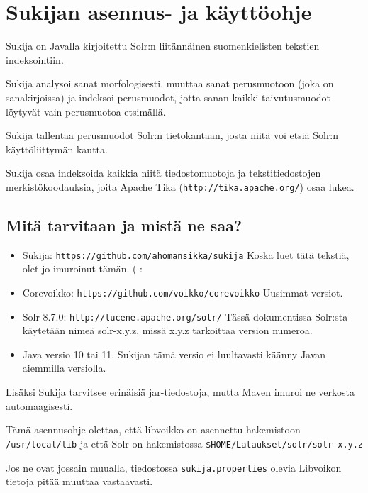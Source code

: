 \documentclass[12pt]{article}
\begin{document}
\pagestyle{fancy}
\setlength{\parindent}{0pt}
\setlength{\parskip}{1ex plus 0.5ex minus 0.2ex}
\section*{Sukijan asennus- ja käyttöohje}


Sukija on Javalla kirjoitettu Solr:n liitännäinen suomenkielisten
tekstien indeksointiin.

Sukija analysoi sanat morfologisesti, muuttaa sanat perusmuotoon (joka
on sanakirjoissa) ja indeksoi perusmuodot, jotta sanan kaikki
taivutusmuodot löytyvät vain perusmuotoa etsimällä.

Sukija tallentaa perusmuodot Solr:n tietokantaan, josta niitä voi
etsiä Solr:n käyttöliittymän kautta.

Sukija osaa indeksoida kaikkia niitä tiedostomuotoja ja
tekstitiedostojen merkistökoodauksia, joita Apache Tika
(\verb=http://tika.apache.org/=) osaa lukea.


\subsection*{Mitä tarvitaan ja mistä ne saa?}

\begin{itemize}
\item Sukija:
      \verb=https://github.com/ahomansikka/sukija=
      Koska luet tätä tekstiä, olet jo imuroinut tämän. (-:

\item Corevoikko:
      \verb=https://github.com/voikko/corevoikko=
      Uusimmat versiot.

\item Solr 8.7.0:
      \verb=http://lucene.apache.org/solr/=
      Tässä dokumentissa Solr:sta käytetään nimeä solr-x.y.z,
      missä x.y.z tarkoittaa version numeroa.

\item Java versio 10 tai 11. Sukijan tämä versio ei luultavasti
      käänny Javan aiemmilla versiolla.
\end{itemize}


Lisäksi Sukija tarvitsee erinäisiä jar-tiedostoja, mutta Maven imuroi
ne verkosta automaagisesti.

Tämä asennusohje olettaa, että libvoikko on asennettu hakemistoon
\verb=/usr/local/lib= ja että Solr on hakemistossa
\verb=$HOME/Lataukset/solr/solr-x.y.z=

Jos ne ovat jossain muualla, tiedostossa \verb=sukija.properties=
olevia Libvoikon tietoja pitää muuttaa vastaavasti.
\end{document}

